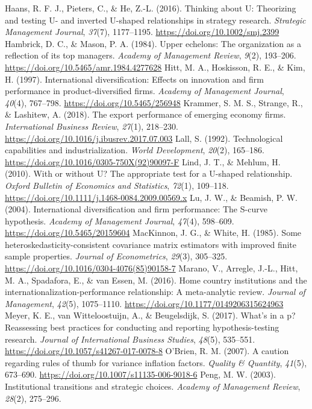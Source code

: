 \documentclass[12pt,a4paper]{article}
\begin{document}
Haans, R. F. J., Pieters, C., \& He, Z.-L. (2016). Thinking about U:
Theorizing and testing U- and inverted U-shaped relationships in
strategy research. \emph{Strategic Management Journal}, \emph{37}(7),
1177--1195. \url{https://doi.org/10.1002/smj.2399} Hambrick, D. C., \&
Mason, P. A. (1984). Upper echelons: The organization as a reflection of
its top managers. \emph{Academy of Management Review}, \emph{9}(2),
193--206. \url{https://doi.org/10.5465/amr.1984.4277628} Hitt, M. A.,
Hoskisson, R. E., \& Kim, H. (1997). International diversification:
Effects on innovation and firm performance in product-diversified firms.
\emph{Academy of Management Journal}, \emph{40}(4), 767--798.
\url{https://doi.org/10.5465/256948} Krammer, S. M. S., Strange, R., \&
Lashitew, A. (2018). The export performance of emerging economy firms.
\emph{International Business Review}, \emph{27}(1), 218--230.
\url{https://doi.org/10.1016/j.ibusrev.2017.07.003} Lall, S. (1992).
Technological capabilities and industrialization. \emph{World
Development}, \emph{20}(2), 165--186.
\url{https://doi.org/10.1016/0305-750X(92)90097-F} Lind, J. T., \&
Mehlum, H. (2010). With or without U? The appropriate test for a
U-shaped relationship. \emph{Oxford Bulletin of Economics and
Statistics}, \emph{72}(1), 109--118.
\url{https://doi.org/10.1111/j.1468-0084.2009.00569.x} Lu, J. W., \&
Beamish, P. W. (2004). International diversification and firm
performance: The S-curve hypothesis. \emph{Academy of Management
Journal}, \emph{47}(4), 598--609. \url{https://doi.org/10.5465/20159604}
MacKinnon, J. G., \& White, H. (1985). Some
heteroskedasticity-consistent covariance matrix estimators with improved
finite sample properties. \emph{Journal of Econometrics}, \emph{29}(3),
305--325. \url{https://doi.org/10.1016/0304-4076(85)90158-7} Marano, V.,
Arregle, J.-L., Hitt, M. A., Spadafora, E., \& van Essen, M. (2016).
Home country institutions and the internationalization-performance
relationship: A meta-analytic review. \emph{Journal of Management},
\emph{42}(5), 1075--1110. \url{https://doi.org/10.1177/0149206315624963}
Meyer, K. E., van Witteloostuijn, A., \& Beugelsdijk, S. (2017). What's
in a p? Reassessing best practices for conducting and reporting
hypothesis-testing research. \emph{Journal of International Business
Studies}, \emph{48}(5), 535--551.
\url{https://doi.org/10.1057/s41267-017-0078-8} O'Brien, R. M. (2007). A
caution regarding rules of thumb for variance inflation factors.
\emph{Quality \& Quantity}, \emph{41}(5), 673--690.
\url{https://doi.org/10.1007/s11135-006-9018-6} Peng, M. W. (2003).
Institutional transitions and strategic choices. \emph{Academy of
Management Review}, \emph{28}(2), 275--296.
\end{document}
